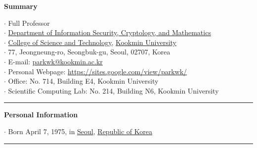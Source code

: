 \documentclass[10pt,A4]{article}
\newcommand{\cvsection}[1]
{
	\begin{center}
		\large\textcolor{sectcol}{\textbf{#1}}
	\end{center}
}
\begin{document}
\cvsection{Summary}\vspace{-6pt}
\vspace{6pt}
$\cdot$ Full Professor\\[3pt]
$\cdot$ \href{http://math.kookmin.ac.kr:8000/}{Department of Information Security, Cryptology, and Mathematics}\\[3pt]
$\cdot$ \href{http://science.kookmin.ac.kr/}{College of Science and Technology}, \href{http://www.kookmin.ac.kr}{Kookmin University}\\[3pt]
$\cdot$ 77, Jeongneung-ro, Seongbuk-gu, Seoul, 02707, Korea\\[3pt]
$\cdot$ E-mail: \href{mailto:parkwk@kookmin.ac.kr}{parkwk@kookmin.ac.kr}\\[3pt]
$\cdot$ Personal Webpage: \url{https://sites.google.com/view/parkwk/}\\[3pt]
$\cdot$ Office: No. 714, Building E4, Kookmin University\\[3pt]
$\cdot$ Scientific Computing Lab: No. 214, Building N6, Kookmin University\\
\textcolor{softcol}{\hrule}

\cvsection{Personal Information}\vspace{-6pt}
\vspace{6pt}
$\cdot$ Born April 7, 1975, in \href{https://english.seoul.go.kr}{Seoul}, \href{http://www.korea.net/}{Republic of Korea}\\
\textcolor{softcol}{\hrule}

\end{document}
